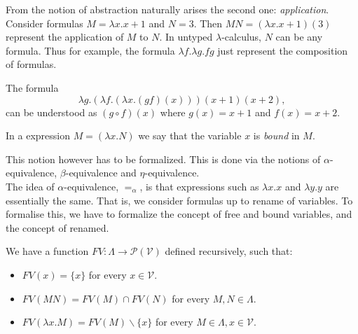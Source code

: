 From the notion of abstraction naturally arises the second one: \emph{application}. Consider formulas $M  =\lambda x. x+1$ and $N = 3$. Then $MN = (\lambda x. x+1)(3)$ represent the application of $M$ to $N$. In untyped $\lambda$-calculus, $N$ can be any formula. Thus for example, the formula $\lambda f.\lambda g. fg$ just represent the composition of formulas.   

\begin{example} The formula $$\lambda g.(\lambda f.(\lambda x. (gf)(x) )) (x+1)(x+2),$$
  can be understood as $(g\circ f) (x)$ where $g(x) = x+1$ and $f(x)=x+2$.
\end{example}

In a expression $M = (\lambda x. N)$ we say that the variable $x$ is \emph{bound} in $M$.

This notion however has to be formalized. This is done via the notions of $\alpha$-equivalence, $\beta$-equivalence and $\eta$-equivalence.\\

The idea of $\alpha$-equivalence, $=_{\alpha}$, is that expressions such as $\lambda x.x$ and $\lambda y.y$ are essentially the same. That is, we consider formulas up to rename of variables. To formalise this, we have to formalize the concept of free and bound variables, and the concept of renamed.

\begin{definition}
  We have a function $FV:\Lambda \to \mathcal{P}(\mathcal{V})$ defined recursively, such that:
  \begin{itemize}
  \item $FV(x) = \{x\}$ for every $x\in \mathcal{V}$.
  \item $FV(MN) = FV(M)\cap FV(N)$ for every $M,N\in \Lambda$.
  \item $FV(\lambda x.M) = FV(M)\backslash \{x\}$ for every $M\in \Lambda, x\in \mathcal{V}$.
  \end{itemize}
\end{definition}

